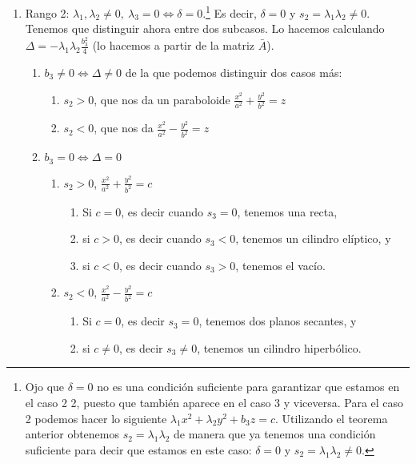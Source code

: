 \documentclass[14pt]{book}
\begin{document}
\begin{enumerate}
\begin{enumerate}
\begin{enumerate}
		\end{enumerate}
	\end{enumerate}
	\item Rango 2: $\lambda_1, \lambda_2 ≠ 0,\ \lambda_3 = 0 \iff \delta = 0$.\footnote{Ojo que $\delta = 0$ no es una condición suficiente para garantizar que estamos en el caso 2 2, puesto que también aparece en el caso 3 y viceversa. Para el caso 2 podemos hacer lo siguiente $\lambda_1 x^2 + \lambda_2 y^2 + b_3z = c$. Utilizando el teorema anterior obtenemos $s_2 = \lambda_1\lambda_2$ de manera que ya tenemos una condición suficiente para decir que estamos en este caso: $\delta = 0$ y $s_2 = \lambda_1\lambda_2 ≠ 0$.} Es decir, $\delta = 0$ y $s_2 = \lambda_1\lambda_2 ≠ 0$. Tenemos que distinguir ahora entre dos subcasos. Lo hacemos calculando $\Delta = -\lambda_1\lambda_2\frac{b_3^2}{4}$ (lo hacemos a partir de la matriz $\bar{A}$).
	\begin{enumerate}
		\item $b_3 ≠ 0 \iff \Delta ≠ 0$ de la que podemos distinguir dos casos más:
		\begin{enumerate}
			\item $s_2 > 0$, que nos da un paraboloide $\frac{x^2}{a^2} + \frac{y^2}{b^2} = z$
			\item $s_2 < 0$, que nos da $\frac{x^2}{a^2} - \frac{y^2}{b^2} = z$
		\end{enumerate}
		\item $b_3 = 0 \iff \Delta = 0$
		\begin{enumerate}
			\item $s_2 > 0$, $\frac{x^2}{a^2} + \frac{y^2}{b^2} = c$
			\begin{enumerate}
				\item Si $c = 0$, es decir cuando $s_3 = 0$, tenemos una recta,
				\item si $c > 0$, es decir cuando $s_3 < 0$, tenemos un cilindro elíptico, y 
				\item si $c < 0$, es decir cuando $s_3 > 0$, tenemos el vacío.
			\end{enumerate}
			\item $s_2 < 0$, $\frac{x^2}{a^2} - \frac{y^2}{b^2} = c$
			\begin{enumerate}
				\item Si $c = 0$, es decir $s_3 = 0$, tenemos dos planos secantes, y
				\item si $c ≠ 0$, es decir $s_3 ≠ 0$, tenemos un cilindro hiperbólico.
			\end{enumerate}
		\end{enumerate}
	\end{enumerate}
\end{enumerate}
\end{document}
